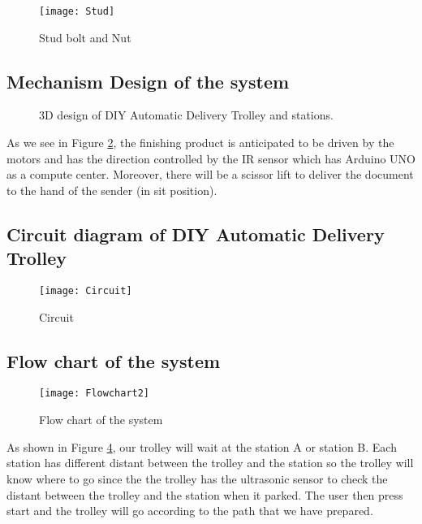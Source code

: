 \documentclass[12pt]{article}
\begin{document}
\begin{figure}[H]
	\centering
	\texttt{[image: Stud]}
	\caption{Stud bolt and Nut} \label{fig:stud}
\end{figure}


\subsection{Mechanism Design of the system} \label{sub:mechanism}

\begin{figure}[H]
	\centering
	 \hspace{1cm}
	\caption{3D design of DIY Automatic Delivery Trolley and stations.} \label{fig:3ddesign}
\end{figure}

As we see in Figure \ref{fig:3ddesign}, the finishing product is anticipated to be driven by the motors and has the direction controlled by the IR sensor which has Arduino UNO as a compute center. Moreover, there will be a scissor lift to deliver the document to the hand of the sender (in sit position).

\subsection{Circuit diagram of DIY Automatic Delivery Trolley} \label{sub:circuit}

\begin{figure}[H]
	\centering
	\texttt{[image: Circuit]}
	\caption{Circuit} \label{fig:cir}
\end{figure}

\subsection{Flow chart of the system}

\begin{figure}[H]
	\centering
	\texttt{[image: Flowchart2]}
	\caption{Flow chart of the system} \label{fig:flowchart}
\end{figure}

As shown in Figure \ref{fig:flowchart}, our trolley will wait at the station A or station B. Each station has different distant between the trolley and the station so the trolley will know where to go since the the trolley has the ultrasonic sensor to check the distant between the trolley and the station when it parked. The user then press start and the trolley will go according to the path that we have prepared.  
\end{document}
